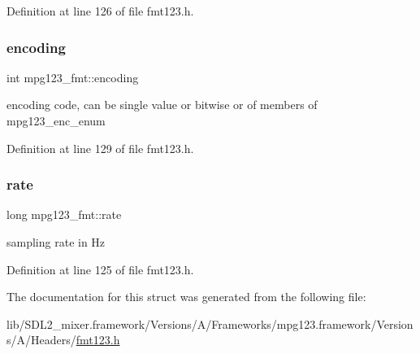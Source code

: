 Definition at line 126 of file fmt123.\+h.

\mbox{\label{structmpg123__fmt_a7c9ec01e750a071c97cea442617e802e}} 
\subsubsection{\texorpdfstring{encoding}{encoding}}
{\footnotesize\ttfamily int mpg123\+\_\+fmt\+::encoding}

encoding code, can be single value or bitwise or of members of mpg123\+\_\+enc\+\_\+enum 

Definition at line 129 of file fmt123.\+h.

\mbox{\label{structmpg123__fmt_ac28086d4f9023626dbbf2ba6601a108e}} 
\subsubsection{\texorpdfstring{rate}{rate}}
{\footnotesize\ttfamily long mpg123\+\_\+fmt\+::rate}

sampling rate in Hz 

Definition at line 125 of file fmt123.\+h.



The documentation for this struct was generated from the following file\+:\begin{DoxyCompactItemize}
\item 
lib/\+S\+D\+L2\+\_\+mixer.\+framework/\+Versions/\+A/\+Frameworks/mpg123.\+framework/\+Versions/\+A/\+Headers/\mbox{\hyperlink{fmt123_8h}{fmt123.\+h}}\end{DoxyCompactItemize}
